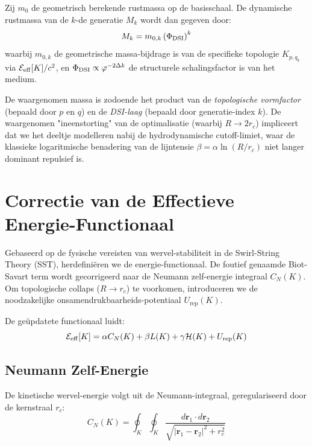 \documentclass[12pt,a4paper]{article}
\begin{document}
Zij $m_0$ de geometrisch berekende rustmassa op de basisschaal. De dynamische rustmassa van de $k$-de generatie $M_k$ wordt dan gegeven door:
\begin{equation}
    M_k = m_{0,k} \left( \Phi_{\rm DSI} \right)^k
\end{equation}
waarbij $m_{0,k}$ de geometrische massa-bijdrage is van de specifieke topologie $K_{p,q_k}$ via $\mathcal{E}_{\rm eff}[K] / c^2$, en $\Phi_{\rm DSI} \propto \varphi^{-2\Delta k}$ de structurele schalingsfactor is van het medium.

De waargenomen massa is zodoende het product van de \textit{topologische vormfactor} (bepaald door $p$ en $q$) en de \textit{DSI-laag} (bepaald door generatie-index $k$). De waargenomen "ineenstorting" van de optimalisatie (waarbij $R \to 2r_c$) impliceert dat we het deeltje modelleren nabij de hydrodynamische cutoff-limiet, waar de klassieke logaritmische benadering van de lijntensie $\beta = \alpha \ln(R/r_c)$ niet langer dominant repulsief is.


\section*{Correctie van de Effectieve Energie-Functionaal}

Gebaseerd op de fysische vereisten van wervel-stabiliteit in de Swirl-String Theory (SST), herdefini\"eren we de energie-functionaal. De foutief genaamde Biot-Savart term wordt gecorrigeerd naar de Neumann zelf-energie integraal $C_N(K)$. Om topologische collaps ($R \to r_c$) te voorkomen, introduceren we de noodzakelijke onsamendrukbaarheids-potentiaal $U_{\text{rep}}(K)$.

De ge\"updatete functionaal luidt:
\begin{equation}
    \mathcal{E}_{\rm eff}[K] = \alpha C_N(K) + \beta L(K) + \gamma \mathcal{H}(K) + U_{\text{rep}}(K)
\end{equation}

\subsection*{Neumann Zelf-Energie}
De kinetische wervel-energie volgt uit de Neumann-integraal, geregulariseerd door de kernstraal $r_c$:
\begin{equation}
    C_N(K) = \oint_K \oint_K \frac{d\mathbf{r}_1 \cdot d\mathbf{r}_2}{\sqrt{|\mathbf{r}_1 - \mathbf{r}_2|^2 + r_c^2}}
\end{equation}
\end{document}

